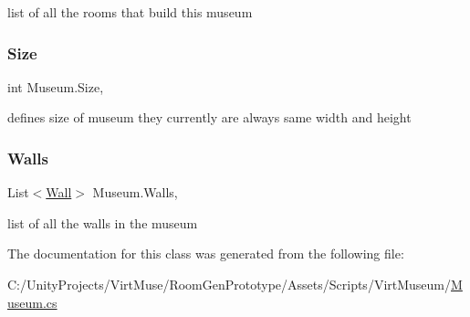 list of all the rooms that build this museum 

\mbox{\label{class_museum_a954b0f1a64a26af54502b46c4058d99d}} 
\subsubsection{\texorpdfstring{Size}{Size}}
{\footnotesize\ttfamily int Museum.\+Size\hspace{0.3cm}{\ttfamily [get]}, {\ttfamily [set]}}



defines size of museum they currently are always same width and height 

\mbox{\label{class_museum_a4851cdf10f162bbf4b26c757874031da}} 
\subsubsection{\texorpdfstring{Walls}{Walls}}
{\footnotesize\ttfamily List$<$\mbox{\hyperlink{class_wall}{Wall}}$>$ Museum.\+Walls\hspace{0.3cm}{\ttfamily [get]}, {}}



list of all the walls in the museum 



The documentation for this class was generated from the following file\+:\begin{DoxyCompactItemize}
\item 
C\+:/\+Unity\+Projects/\+Virt\+Muse/\+Room\+Gen\+Prototype/\+Assets/\+Scripts/\+Virt\+Museum/\mbox{\hyperlink{_museum_8cs}{Museum.\+cs}}\end{DoxyCompactItemize}
